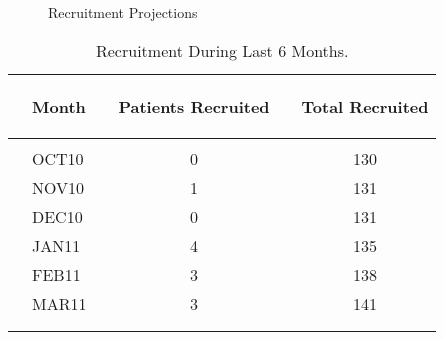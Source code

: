 \documentclass[dvips,10pt]{article}
\begin{document}
\begin{figure}
\caption{Recruitment Projections }
\end{figure}
\begin{table}[t]
\caption
{ Recruitment During Last 6 Months. }
\begin{center}
\begin{tabular}{ @{}l@{}
@{}l@{}@{}p{1.5em}@{}@{}c@{}@{}p{1.5em}@{}@{}c@{}
}
\hline

& \parbox{6em}{\begin{center}Month\end{center}} && \parbox{6em}{\begin{center}Patients Recruited\end{center}} && \parbox{6em}{\begin{center}Total Recruited\end{center}} \\

\hline

\\
& OCT10 && 0 && 130 \\
& NOV10 && 1 && 131 \\
& DEC10 && 0 && 131 \\
& JAN11 && 4 && 135 \\
& FEB11 && 3 && 138 \\
& MAR11 && 3 && 141 \\
\\
\hline \\

\end{tabular}

\end{center}
 \end{table}
\clearpage
\end{document}
